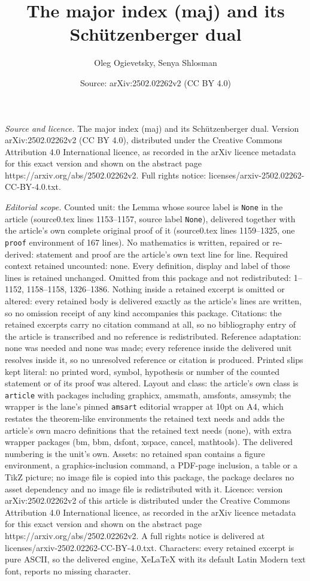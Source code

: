 \documentclass[10pt,a4paper]{amsart}
\title[The major index (maj) and its Sch\"utzenberger dual]{The major index (maj) and its Sch\"utzenberger dual}
\author{Oleg Ogievetsky, Senya Shlosman}
\date{Source: arXiv:2502.02262v2 (CC BY 4.0)}
\begin{document}
\maketitle

\noindent\emph{Source and licence.} The major index (maj) and its Sch\"utzenberger dual. Version arXiv:2502.02262v2 (CC BY 4.0), distributed under the Creative Commons Attribution 4.0 International licence, as recorded in the arXiv licence metadata for this exact version and shown on the abstract page https://arxiv.org/abs/2502.02262v2. Full rights notice: licenses/arxiv-2502.02262-CC-BY-4.0.txt.\par\smallskip

\noindent\textit{Editorial scope.} Counted unit: the Lemma whose source label is \texttt{None} in the article (source0.tex lines 1153--1157, source label \texttt{None}), delivered together with the article's own complete original proof of it (source0.tex lines 1159--1325, one \texttt{proof} environment of 167 lines). No mathematics is written, repaired or re-derived: statement and proof are the article's own text line for line. Required context retained uncounted: none. Every definition, display and label of those lines is retained unchanged. Omitted from this package and not redistributed: 1--1152, 1158--1158, 1326--1386. Nothing inside a retained excerpt is omitted or altered: every retained body is delivered exactly as the article's lines are written, so no omission receipt of any kind accompanies this package. Citations: the retained excerpts carry no citation command at all, so no bibliography entry of the article is transcribed and no reference is redistributed. Reference adaptation: none was needed and none was made; every reference inside the delivered unit resolves inside it, so no unresolved reference or citation is produced. Printed slips kept literal: no printed word, symbol, hypothesis or number of the counted statement or of its proof was altered. Layout and class: the article's own class is \texttt{article} with packages including graphicx, amsmath, amsfonts, amssymb; the wrapper is the lane's pinned \texttt{amsart} editorial wrapper at 10pt on A4, which restates the theorem-like environments the retained text needs and adds the article's own macro definitions that the retained text needs (none), with extra wrapper packages (bm, bbm, dsfont, xspace, cancel, mathtools). The delivered numbering is the unit's own. Assets: no retained span contains a figure environment, a graphics-inclusion command, a PDF-page inclusion, a table or a TikZ picture; no image file is copied into this package, the package declares no asset dependency and no image file is redistributed with it. Licence: version arXiv:2502.02262v2 of this article is distributed under the Creative Commons Attribution 4.0 International licence, as recorded in the arXiv licence metadata for this exact version and shown on the abstract page https://arxiv.org/abs/2502.02262v2. A full rights notice is delivered at licenses/arxiv-2502.02262-CC-BY-4.0.txt. Characters: every retained excerpt is pure ASCII, so the delivered engine, XeLaTeX with its default Latin Modern text font, reports no missing character.
\end{document}

